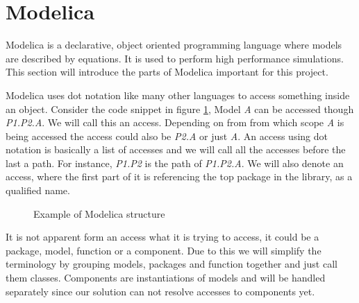 \documentclass{cslthse-msc}
\begin{document}
\section{Modelica}
Modelica is a declarative, object oriented programming language where models are described by equations. It is used to perform high performance simulations. This section will introduce the parts of Modelica important for this project.

Modelica uses dot notation like many other languages to access something inside an object. Consider the code snippet in figure \ref{fig:modelicaExample}, Model \textit{A} can be accessed though \textit{P1.P2.A}. We will call this an access. Depending on from from which scope \textit{A} is being accessed the access could also be \textit{P2.A} or just \textit{A}. An access using dot notation is basically a list of accesses and we will call all the accesses before the last a path. For instance, \textit{P1.P2} is the path of \textit{P1.P2.A}. We will also denote an access, where the first part of it is referencing the top package in the library, as a qualified name.

\begin{figure}[!htbp]
    \centering
    \qquad
    \subfloat{\raisebox{3.2 cm}{}}
    \caption{Example of Modelica structure}
    \label{fig:modelicaExample}
\end{figure}

It is not apparent form an access what it is trying to access, it could be a package, model, function or a component. Due to this we will simplify the terminology by grouping models, packages and function together and just call them classes. Components are instantiations of models and will be handled separately since our solution can not resolve accesses to components yet.
\end{document}
